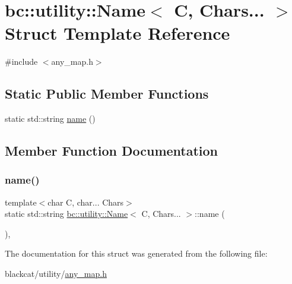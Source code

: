 \hypertarget{structbc_1_1utility_1_1Name_3_01C_00_01Chars_8_8_8_01_4}{}\section{bc\+:\+:utility\+:\+:Name$<$ C, Chars... $>$ Struct Template Reference}
\label{structbc_1_1utility_1_1Name_3_01C_00_01Chars_8_8_8_01_4}


{\ttfamily \#include $<$any\+\_\+map.\+h$>$}

\subsection*{Static Public Member Functions}
\begin{DoxyCompactItemize}
\item 
static std\+::string \hyperlink{structbc_1_1utility_1_1Name_3_01C_00_01Chars_8_8_8_01_4_add1fffb76ad164f9b3542eb5a46ef2b8}{name} ()
\end{DoxyCompactItemize}


\subsection{Member Function Documentation}
\mbox{\label{structbc_1_1utility_1_1Name_3_01C_00_01Chars_8_8_8_01_4_add1fffb76ad164f9b3542eb5a46ef2b8}} 
\subsubsection{\texorpdfstring{name()}{name()}}
{\footnotesize\ttfamily template$<$char C, char... Chars$>$ \\
static std\+::string \hyperlink{structbc_1_1utility_1_1Name}{bc\+::utility\+::\+Name}$<$ C, Chars... $>$\+::name (\begin{DoxyParamCaption}{ }\end{DoxyParamCaption})\hspace{0.3cm}{\ttfamily [inline]}, {\ttfamily [static]}}



The documentation for this struct was generated from the following file\+:\begin{DoxyCompactItemize}
\item 
blackcat/utility/\hyperlink{any__map_8h}{any\+\_\+map.\+h}\end{DoxyCompactItemize}
